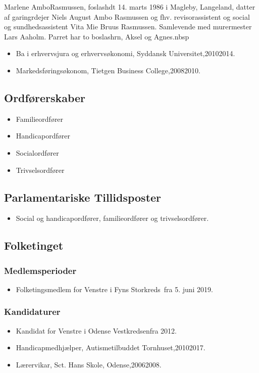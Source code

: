 \documentclass[11pt, a4paper]{awesome-cv}
\begin{document}
\makecvheader[R]
\makelettertitle
\begin{cvletter}
Marlene AmboRasmussen, foslashdt 14. marts 1986 i Magleby, Langeland, datter af garingrdejer Niels August Ambo Rasmussen og fhv. revisorassistent og social og sundhedsassistent Vita Mie Bruus Rasmussen. Samlevende med murermester Lars Aaholm. Parret har to boslashrn, Aksel og Agnes.nbsp

\begin{itemize}
\item Ba i erhvervsjura og erhvervsøkonomi, Syddansk Universitet,20102014.
\item Markedsføringsøkonom, Tietgen Business College,20082010.
\end{itemize}
\subsection*{Ordførerskaber}
\begin{itemize}
\item Familieordfører
\item Handicapordfører
\item Socialordfører
\item Trivselsordfører
\end{itemize}
\subsection*{Parlamentariske Tillidsposter}
\begin{itemize}
\item Social og handicapordfører, familieordfører og trivselsordfører.
\end{itemize}
\subsection*{Folketinget}
\subsubsection*{Medlemsperioder}
\begin{itemize}
\item Folketingsmedlem for Venstre i Fyns Storkreds fra 5. juni 2019.
\end{itemize}
\subsubsection*{Kandidaturer}
\begin{itemize}
\item Kandidat for Venstre i Odense Vestkredsenfra 2012.
\end{itemize}
\begin{itemize}
\item Handicapmedhjælper, Autismetilbuddet Tornhuset,20102017.
\item Lærervikar, Sct. Hans Skole, Odense,20062008.
\end{itemize}
\end{cvletter}
\end{document}
